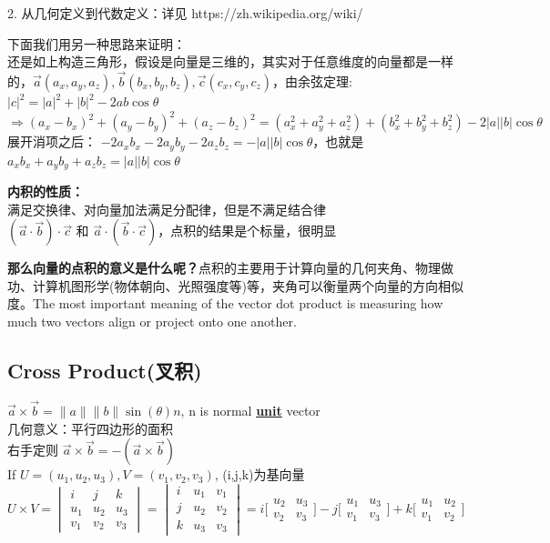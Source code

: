 \documentclass[../main.tex]{subfiles}
\begin{document}
2. 从几何定义到代数定义：详见 https://zh.wikipedia.org/wiki/%

下面我们用另一种思路来证明：\\
还是如上构造三角形，假设是向量是三维的，其实对于任意维度的向量都是一样的，$\vec a(a_x, a_y, a_z), \vec b(b_x, b_y, b_z), \vec c(c_x, c_y, c_z)$，由余弦定理:\\
$|c|^2=|a|^2+|b|^2-2ab\cos \theta $\\
$\Rightarrow (a_x-b_x)^2+(a_y-b_y)^2+(a_z-b_z)^2=(a_x^2+a_y^2+a_z^2)+(b_x^2+b_y^2+b_z^2)-2|a| |b|\cos \theta$\\
展开消项之后：
$-2a_xb_x-2a_yb_y-2a_zb_z=-|a||b|\cos \theta$，也就是\\
$a_xb_x+a_yb_y+a_zb_z=|a||b| \cos \theta$

\textbf{内积的性质：}\\
满足交换律、对向量加法满足分配律，但是不满足结合律\\
$(\vec a \cdot \vec b)\cdot \vec c$ 和 $\vec a \cdot (\vec b \cdot \vec c)$，点积的结果是个标量，很明显

\textbf{那么向量的点积的意义是什么呢？}点积的主要用于计算向量的几何夹角、物理做功、计算机图形学(物体朝向、光照强度等)等，夹角可以衡量两个向量的方向相似度。The most important meaning of the vector dot product is measuring how much two vectors align or project onto one another.

\subsection{Cross Product(叉积)}
$\vec{a} \times \vec{b} = \|a\|\|b\| \sin(\theta)n$, n is normal \underline{\textbf{unit}} vector\\
几何意义：平行四边形的面积\\
右手定则 $\vec{a} \times \vec{b} = -(\vec{a} \times \vec{b})$\\
If $ U = (u_1,u_2,u_3), V = (v_1,v_2,v_3)$, (i,j,k)为基向量\\
$
U \times V =
\begin{vmatrix}
  i & j & k\\
  u_1 & u_2 & u_3\\
  v_1 & v_2 & v_3
\end{vmatrix}
=
\begin{vmatrix}
  i & u_1 & v_1\\
  j & u_2 & v_2\\
  k & u_3 & v_3
\end{vmatrix}
=
i\bigl[\begin{smallmatrix} u_2&u_3\\v_2&v_3 \end{smallmatrix} \bigr]-
j\bigl[\begin{smallmatrix} u_1&u_3\\v_1&v_3 \end{smallmatrix} \bigr]+
k\bigl[\begin{smallmatrix} u_1&u_2\\v_1&v_2 \end{smallmatrix} \bigr]
$
\end{document}
